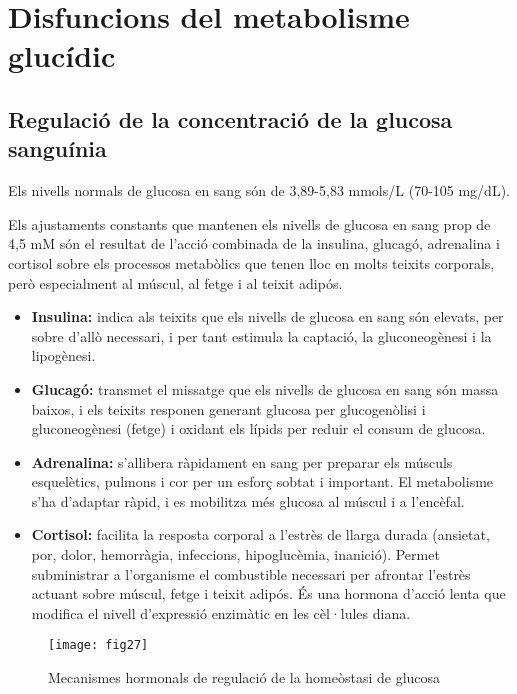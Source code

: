 \section{Disfuncions del metabolisme glucídic}
\label{sec:disf-del-metab}

\subsection{Regulació de la concentració de la glucosa sanguínia}
\label{sec:regulacio-de-la}
Els nivells normals de glucosa en sang són de 3,89-5,83 mmols/L
(70-105 mg/dL).

Els ajustaments constants que mantenen els nivells de glucosa en sang
prop de 4,5 mM són el resultat de l'acció combinada de la insulina,
glucagó, adrenalina i cortisol sobre els processos metabòlics que
tenen lloc en molts teixits corporals, però especialment al múscul, al
fetge i al teixit adipós. 

\begin{itemize}
\item \textbf{Insulina:} indica als teixits que els nivells de glucosa
  en sang són elevats, per sobre d'allò necessari, i per tant estimula
  la captació, la gluconeogènesi i la lipogènesi. 
\item \textbf{Glucagó:} transmet el missatge que els nivells de
  glucosa en sang són massa baixos, i els teixits responen generant glucosa per
glucogenòlisi i gluconeogènesi (fetge) i oxidant els lípids per reduir
el consum de glucosa. 
\item \textbf{Adrenalina:} s'allibera ràpidament en sang per preparar els músculs
esquelètics, pulmons i cor per un esforç sobtat i important. El
metabolisme s'ha d'adaptar ràpid, i es mobilitza més glucosa al múscul
i a l'encèfal. 
\item \textbf{Cortisol:} facilita la resposta corporal a l'estrès de llarga durada
(ansietat, por, dolor, hemorràgia, infeccions, hipoglucèmia,
inanició). Permet subministrar a l'organisme el combustible necessari
per afrontar l'estrès actuant sobre múscul, fetge i teixit adipós. És
una hormona d'acció lenta que modifica el nivell d'expressió enzimàtic
en les cèl·lules diana.
\end{itemize}

\begin{figure}[H]
  \centering
  \texttt{[image: fig27]}
  \caption{Mecanismes hormonals de regulació de la homeòstasi de
    glucosa}
  \label{fig:fig27}
\end{figure}


